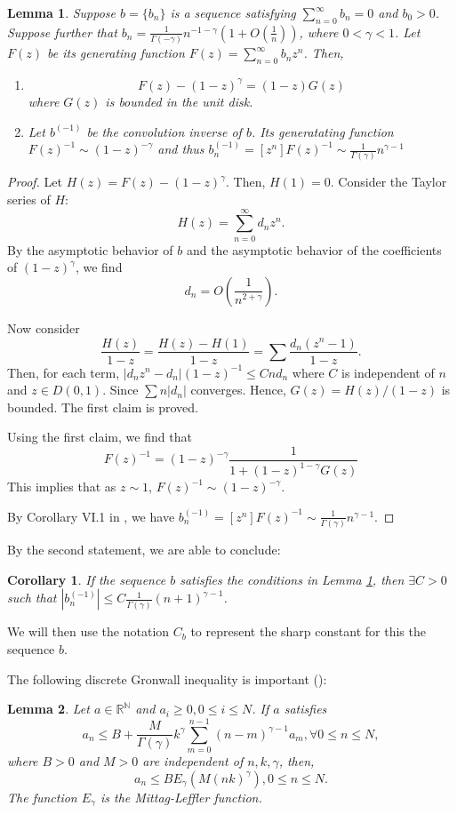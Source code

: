 \documentclass[11pt]{article} %
\newtheorem{lmm}{Lemma}
\newtheorem{cor}{Corollary}
\begin{document}
\begin{lmm}\label{lmm:convinv}
Suppose $b=\{b_n\}$ is a sequence satisfying $\sum_{n=0}^{\infty}b_n=0$
and $b_0>0$. Suppose further that $b_n=\frac{1}{\Gamma(-\gamma)}n^{-1-\gamma}(1+O(\frac{1}{n}))$, where $0<\gamma<1$. Let $F(z)$ be its generating function $F(z)=\sum_{n=0}^{\infty}b_n z^n$. Then, 
\begin{enumerate}
\item $$
F(z)-(1-z)^{\gamma}=(1-z)G(z)
$$
where $G(z)$ is bounded in the unit disk.
\item Let $b^{(-1)}$ be the convolution inverse of $b$. Its generatating function $F(z)^{-1}\sim (1-z)^{-\gamma}$ and thus $b^{(-1)}_n=[z^n]F(z)^{-1}\sim \frac{1}{\Gamma(\gamma)}n^{\gamma-1}$ 
\end{enumerate}
\end{lmm}
\begin{proof}
Let $H(z)=F(z)-(1-z)^{\gamma}$. Then, $H(1)=0$. Consider the Taylor series of $H$: $$
H(z)=\sum_{n=0}^{\infty}d_n z^n.
$$
By the asymptotic behavior of $b$ and the asymptotic behavior of the coefficients of $(1-z)^{\gamma}$, we find
$$d_n=O(\frac{1}{n^{2+\gamma}}).$$ 

Now consider $$
\frac{H(z)}{1-z}=\frac{H(z)-H(1)}{1-z}=\sum \frac{d_n(z^n-1)}{1-z}.
$$
Then, for each term, 
$|d_nz^n-d_n|(1-z)^{-1}\le Cnd_n$ where $C$ is independent of $n$ and $z\in D(0,1)$. Since $\sum n|d_n|$ converges. Hence, $G(z)=H(z)/(1-z)$ is bounded. The first claim is proved.


Using the first claim, we find that $$
F(z)^{-1}=(1-z)^{-\gamma}\frac{1}{1+(1-z)^{1-\gamma}G(z)}
$$
This implies that as $z\sim 1$, $F(z)^{-1}\sim (1-z)^{-\gamma}$.

By Corollary VI.1 in \cite{fs09}, we have 
$b^{(-1)}_n=[z^n]F(z)^{-1}\sim \frac{1}{\Gamma(\gamma)}n^{\gamma-1}$.
\end{proof}
By the second statement, we are able to conclude:
\begin{cor}
 If the sequence $b$ satisfies the conditions in Lemma \ref{lmm:convinv}, then $\exists C>0$ such that $|b_n^{(-1)}|\le C\frac{1}{\Gamma(\gamma)}(n+1)^{\gamma-1}$.  
\end{cor}
We will then use the notation $C_b$ to represent the sharp constant for this the sequence $b$.

The following discrete Gronwall inequality is important (\cite{dixon86}): 
\begin{lmm}
Let $a\in \mathbb{R}^{\mathbb{N}}$ and $a_i\ge 0, 0\le i\le N$. If $a$ satisfies $$
a_n\le B+\frac{M}{\Gamma(\gamma)}k^{\gamma}\sum_{m=0}^{n-1}(n-m)^{\gamma-1}a_m, \forall 0\le n\le N,
$$
where $B>0$ and $M>0$ are independent of $n, k, \gamma$, then, $$
a_n\le BE_{\gamma}(M(nk)^{\gamma}), 0\le n\le N.
$$
The function $E_{\gamma}$ is the Mittag-Leffler function.
\end{lmm}
\end{document}
